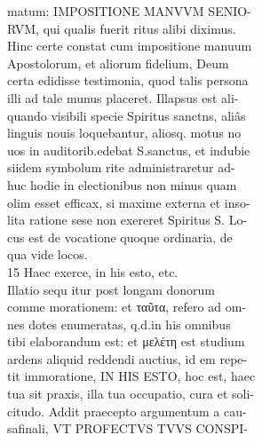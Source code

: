 \documentclass{article}
\begin{document}
\begin{pages}
                matum: IMPOSITIONE MANVVM SENIO- \\
                RVM, qui qualis fuerit ritus alibi diximus. \\
                Hinc certe constat cum impositione manuum \\
                Apostolorum, et aliorum fidelium, Deum \\
                certa edidisse testimonia, quod talis persona \\
                illi ad tale munus placeret. Illapsus est ali- \\
                quando visibili specie Spiritus sanctns, aliâs \\
                linguis nouis loquebantur, aliosq. motus no \\
                uos in auditorib.edebat S.sanctus, et indubie \\
                siidem symbolum rite administraretur ad- \\
                huc hodie in electionibus non minus quam \\
                olim esset efficax, si maxime externa et inso- \\
                lita ratione sese non exereret Spiritus S. Lo- \\
                cus est de vocatione quoque ordinaria, de \\
                qua vide locos. \\
                15 Haec exerce, in his esto, etc. \\
                Illatio sequ itur post longam donorum \\
                comme morationem: et ταῦτα, refero ad om- \\
                nes dotes enumeratas, q.d.in his omnibus \\
                tibi elaborandum est: et μελέτη est studium \\
                ardens aliquid reddendi auctius, id em repe- \\
                tit immoratione, IN HIS ESTO, hoc est, haec \\
                tua sit praxis, illa tua occupatio, cura et soli- \\
                citudo. Addit praecepto argumentum a cau- \\
                safinali, VT PROFECTVS TVVS CONSPI- \\

\end{pages}
\end{document}
